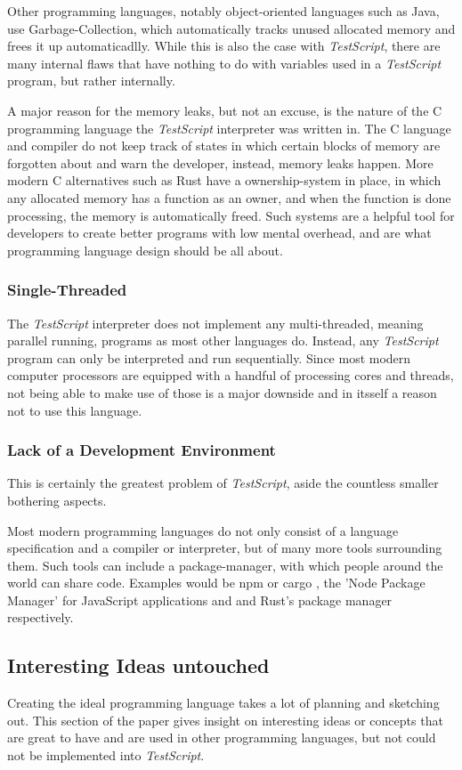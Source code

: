 \documentclass[12pt,a4paper]{article}
\newcommand{\cte}[1] {
    \cite{#1}
}
\newcommand{\name}{\emph{TestScript}}
\begin{document}
Other programming languages, notably object-oriented languages such as Java,
use Garbage-Collection, which automatically tracks unused allocated memory and
frees it up automaticadlly. While this is also the case with \name{}, there are
many internal flaws that have nothing to do with variables used in a \name{}
program, but rather internally. 

A major reason for the memory leaks, but not an excuse, is the nature of the
C programming language the \name{} interpreter was written in. The C language and
compiler do not keep track of states in which certain blocks of memory are
forgotten about and warn the developer, instead, memory leaks happen.
More modern C alternatives such as Rust have a ownership-system in place,
in which any allocated memory has a function as an owner, and when the function
is done processing, the memory is automatically freed. Such systems are a
helpful tool for developers to create better programs with low mental overhead,
and are what programming language design should be all about.

\subsubsection{Single-Threaded}
The \name{} interpreter does not implement any multi-threaded, meaning parallel
running, programs as most other languages do. Instead, any \name{} program can
only be interpreted and run sequentially. Since most modern computer processors
are equipped with a handful of processing cores and threads, not being able to
make use of those is a major downside and in itsself a reason not to use this
language.

\subsubsection{Lack of a Development Environment}
This is certainly the greatest problem of \name{}, aside the countless smaller
bothering aspects.

Most modern programming languages do not only consist
of a language specification and a compiler or interpreter, but of many more
tools surrounding them.
Such tools can include a package-manager, with which people around the world
can share code. Examples would be npm\cte{npm} or cargo\cte{cargo}, 
the 'Node Package Manager' for JavaScript applications and and Rust's package 
manager respectively.

\subsection{Interesting Ideas untouched}
Creating the ideal programming language takes a lot of planning and sketching
out. This section of the paper gives insight on interesting ideas or concepts
that are great to have and are used in other programming languages, but not 
could not be implemented into \name{}.
\end{document}
